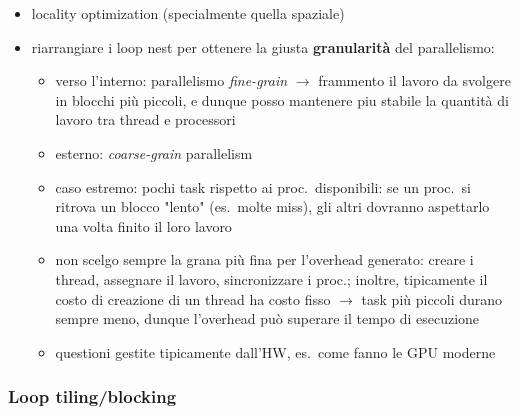 \begin{itemize}
  \item locality optimization (specialmente quella spaziale)
  \item riarrangiare i loop nest per ottenere la giusta \textbf{granularit\`a} del parallelismo:
    \begin{itemize}
      \item verso l'interno: parallelismo \textit{fine-grain} $\rightarrow$ frammento il lavoro da svolgere in blocchi pi\`u piccoli, e dunque posso mantenere piu stabile la quantit\`a di lavoro tra thread e processori
      \item esterno: \textit{coarse-grain} parallelism
      \item caso estremo: pochi task rispetto ai proc.~disponibili: se un proc.~si ritrova un blocco "lento" (es.~molte miss), gli altri dovranno aspettarlo una volta finito il loro lavoro
      \item non scelgo sempre la grana pi\`u fina per l'overhead generato: creare i thread, assegnare il lavoro, sincronizzare i proc.; inoltre, tipicamente il costo di creazione di un thread ha costo fisso $\rightarrow$ task pi\`u piccoli durano sempre meno, dunque l'overhead pu\`o superare il tempo di esecuzione
      \item questioni gestite tipicamente dall'HW, es.~come fanno le GPU moderne 
    \end{itemize}
\end{itemize}

\subsubsection{Loop tiling/blocking}

